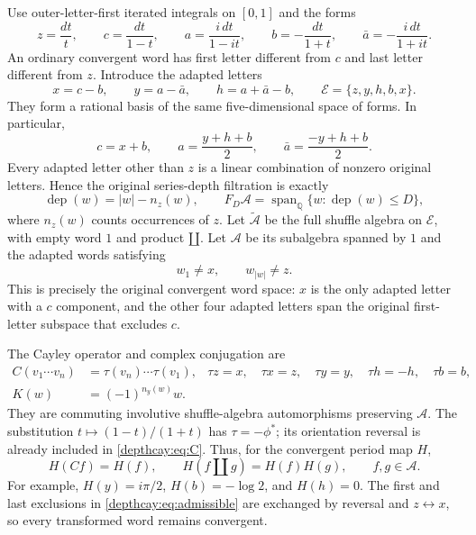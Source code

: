 \documentclass[11pt,a4paper]{article}
\numberwithin{equation}{section}
\theoremstyle{definition}
\theoremstyle{remark}
\newcommand{\shuffle}{\mathbin{\amalg}}
\begin{document}
Use outer-letter-first iterated integrals on $[0,1]$ and the forms
\[
 z=\frac{dt}{t},\qquad c=\frac{dt}{1-t},\qquad
 a=\frac{i\,dt}{1-it},\qquad b=-\frac{dt}{1+t},\qquad
 \bar a=-\frac{i\,dt}{1+it}.
\]
An ordinary convergent word has first letter different from $c$ and last
letter different from $z$. Introduce the adapted letters
\begin{equation}\label{depthcay:eq:alphabet}
 x=c-b,\qquad y=a-\bar a,\qquad h=a+\bar a-b,
 \qquad \mathcal E=\{z,y,h,b,x\}.
\end{equation}
They form a rational basis of the same five-dimensional space of forms.
In particular,
\[
 c=x+b,\qquad a=\frac{y+h+b}{2},\qquad
 \bar a=\frac{-y+h+b}{2}.
\]
Every adapted letter other than $z$ is a linear combination of nonzero
original letters. Hence the original series-depth filtration is exactly
\begin{equation}\label{depthcay:eq:depth}
 \operatorname{dep}(w)=|w|-n_z(w),\qquad
 F_D\mathcal A=\operatorname{span}_{\mathbb Q}
 \{w:\operatorname{dep}(w)\le D\},
\end{equation}
where $n_z(w)$ counts occurrences of $z$.
Let $\widetilde{\mathcal A}$ be the full shuffle algebra on $\mathcal E$,
with empty word $1$ and product $\shuffle$. Let $\mathcal A$ be its
subalgebra spanned by $1$ and the adapted words satisfying
\begin{equation}\label{depthcay:eq:admissible}
 w_1\ne x,\qquad w_{|w|}\ne z.
\end{equation}
This is precisely the original convergent word space: $x$ is the only
adapted letter with a $c$ component, and the other four adapted letters
span the original first-letter subspace that excludes $c$.

The Cayley operator and complex conjugation are
\begin{align}
 C(v_1\cdots v_n)&=\tau(v_n)\cdots\tau(v_1),&
 \tau z=x,\quad\tau x=z,\quad\tau y=y,\quad
 \tau h=-h,\quad\tau b=b,\label{depthcay:eq:C}\\
 K(w)&=(-1)^{n_y(w)}w.&&\label{depthcay:eq:K}
\end{align}
They are commuting involutive shuffle-algebra automorphisms preserving
$\mathcal A$. The substitution $t\mapsto(1-t)/(1+t)$ has
$\tau=-\phi^*$; its orientation reversal is already included in
\eqref{depthcay:eq:C}. Thus, for the convergent period map $H$,
\begin{equation}\label{depthcay:eq:period-C}
 H(Cf)=H(f),\qquad H(f\shuffle g)=H(f)H(g),\qquad f,g\in\mathcal A.
\end{equation}
For example, $H(y)=i\pi/2$, $H(b)=-\log2$, and $H(h)=0$.
The first and last exclusions in \eqref{depthcay:eq:admissible} are
exchanged by reversal and $z\leftrightarrow x$, so every transformed
word remains convergent.
\end{document}
